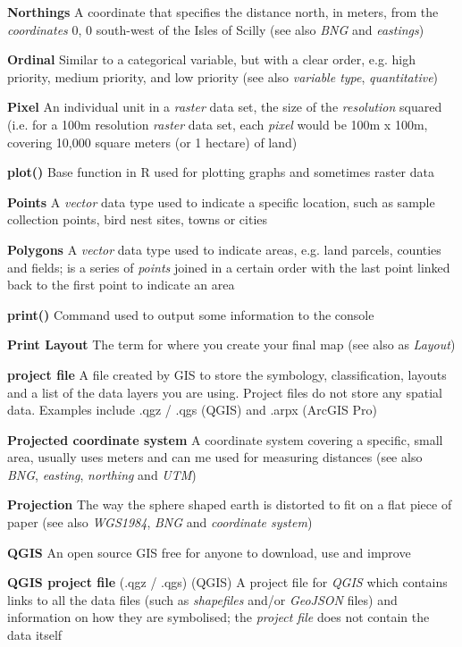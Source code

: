 \documentclass[a4paper,10pt]{article}
\begin{document}
\begin{multicols}{2}
\textbf{Northings} A coordinate that specifies the distance north, in meters, from the \textit{coordinates} 0, 0 south-west of the Isles of Scilly (see also \textit{BNG} and \textit{eastings})

\textbf{Ordinal} Similar to a categorical variable, but with a clear order, e.g. high priority, medium priority, and low priority (see also \textit{variable type}, \textit{quantitative}) 

\textbf{Pixel} An individual unit in a \textit{raster} data set, the size of the \textit{resolution} squared (i.e. for a 100m resolution \textit{raster} data set, each \textit{pixel} would be 100m x 100m, covering 10,000 square meters (or 1 hectare) of land)

\textbf{plot()} Base function in R used for plotting graphs and sometimes raster data

\textbf{Points} A \textit{vector} data type used to indicate a specific location, such as sample collection points, bird nest sites, towns or cities

\textbf{Polygons} A \textit{vector} data type used to indicate areas, e.g. land parcels, counties and fields; is a series of \textit{points} joined in a certain order with the last point linked back to the first point to indicate an area

\textbf{print()} Command used to output some information to the console

\textbf{Print Layout} The term for where you create your final map (see also as \textit{Layout})

\textbf{project file} A file created by GIS to store the symbology, classification, layouts and a list of the data layers you are using. Project files do not store any spatial data. Examples include .qgz / .qgs (QGIS) and .arpx (ArcGIS Pro)

\textbf{Projected coordinate system} A coordinate system covering a specific, small area, usually uses meters and can me used for measuring distances (see also \textit{BNG}, \textit{easting}, \textit{northing} and \textit{UTM})

\textbf{Projection} The way the sphere shaped earth is distorted to fit on a flat piece of paper (see also \textit{WGS1984}, \textit{BNG} and \textit{coordinate system})

\textbf{QGIS} An open source GIS free for anyone to download, use and improve

\textbf{QGIS project file} (.qgz / .qgs) (QGIS) A project file for \textit{QGIS} which contains links to all the data files (such as \textit{shapefiles} and/or \textit{GeoJSON} files) and information on how they are symbolised; the \textit{project file} does not contain the data itself


\end{multicols}
\end{document}
